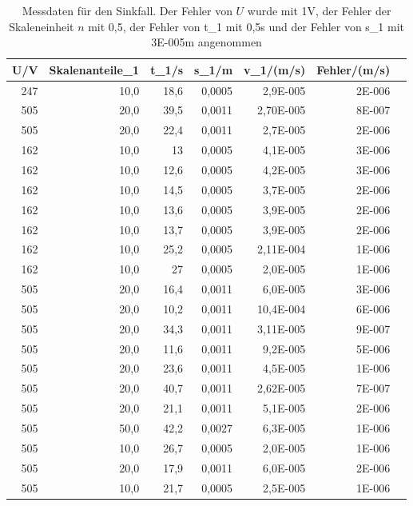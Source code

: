 \documentclass[12pt]{scrartcl}
\begin{document}
\begin{table}[H]
\caption{Messdaten für den Sinkfall. Der Fehler von $U$ wurde mit 1V, der Fehler der Skaleneinheit $n$ mit 0,5, der Fehler von t\_1 mit 0,5s und der Fehler von s\_1 mit 3E-005m angenommen}
\begin{center}
\begin{tabular}{|r|r|r|r|r|r|r|}
\hline
\multicolumn{1}{|l|}{U/V} & \multicolumn{1}{l|}{Skalenanteile\_1} & \multicolumn{1}{l|}{t\_1/s} & \multicolumn{1}{l|}{s\_1/m} & \multicolumn{1}{l|}{v\_1/(m/s)} & \multicolumn{1}{l|}{Fehler/(m/s)} \\ \hline
247 & 10,0 & 18,6 & 0,0005 & 2,9E-005 & 2E-006 \\ \hline
505 & 20,0 & 39,5 & 0,0011  & 2,70E-005 & 8E-007 \\ \hline
505 & 20,0 & 22,4 & 0,0011 & 2,7E-005  & 2E-006 \\ \hline
162 & 10,0 & 13 & 0,0005  & 4,1E-005 & 3E-006 \\ \hline
162 & 10,0 & 12,6 & 0,0005  & 4,2E-005 & 3E-006 \\ \hline
162 & 10,0 & 14,5 & 0,0005  & 3,7E-005 & 2E-006 \\ \hline
162 & 10,0 & 13,6 & 0,0005  & 3,9E-005 & 2E-006 \\ \hline
162 & 10,0 & 13,7 & 0,0005  & 3,9E-005 & 2E-006 \\ \hline
162 & 10,0 & 25,2 & 0,0005  & 2,11E-004 & 1E-006 \\ \hline
162 & 10,0 & 27 & 0,0005  & 2,0E-005 & 1E-006 \\ \hline
505 & 20,0 & 16,4 & 0,0011  & 6,0E-005 & 3E-006 \\ \hline
505 & 20,0 & 10,2 & 0,0011  & 10,4E-004 & 6E-006 \\ \hline
505 & 20,0 & 34,3 & 0,0011  & 3,11E-005 & 9E-007 \\ \hline
505 & 20,0 & 11,6 & 0,0011  & 9,2E-005 & 5E-006 \\ \hline
505 & 20,0 & 23,6 & 0,0011  & 4,5E-005 & 1E-006 \\ \hline
505 & 20,0 & 40,7 & 0,0011  & 2,62E-005 & 7E-007 \\ \hline
505 & 20,0 & 21,1 & 0,0011  & 5,1E-005 & 2E-006 \\ \hline
505 & 50,0 & 42,2 & 0,0027  & 6,3E-005 & 1E-006 \\ \hline
505 & 10,0 & 26,7 & 0,0005  & 2,0E-005 & 1E-006 \\ \hline
505 & 20,0 & 17,9 & 0,0011  & 6,0E-005 & 2E-006 \\ \hline
505 & 10,0 & 21,7 & 0,0005  & 2,5E-005 & 1E-006 \\ \hline

\end{tabular}
\end{center}
\end{table}
\end{document}
